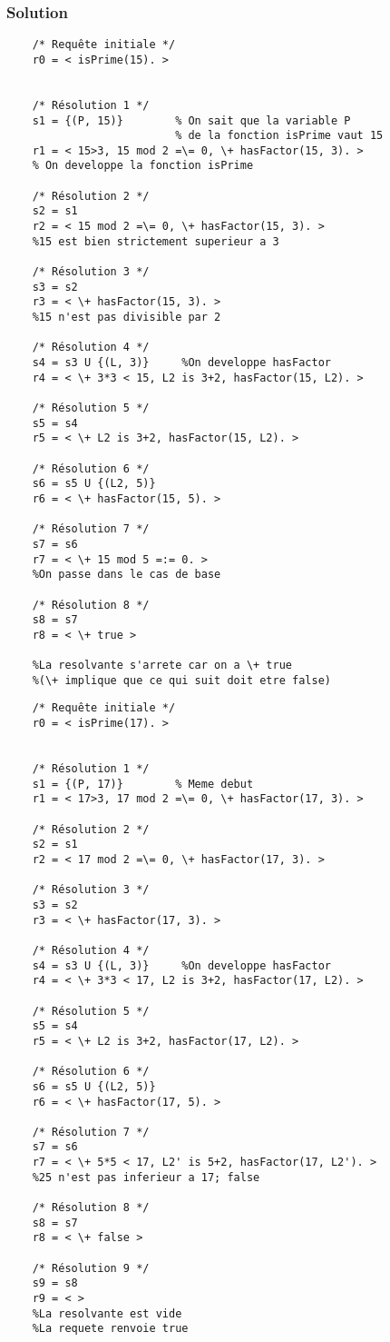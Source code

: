     \subsubsection*{Solution}

    \begin{lstlisting}
    /* Requête initiale */
    r0 = < isPrime(15). >


    /* Résolution 1 */
    s1 = {(P, 15)}        % On sait que la variable P
                          % de la fonction isPrime vaut 15
    r1 = < 15>3, 15 mod 2 =\= 0, \+ hasFactor(15, 3). >
    % On developpe la fonction isPrime

    /* Résolution 2 */
    s2 = s1
    r2 = < 15 mod 2 =\= 0, \+ hasFactor(15, 3). >
    %15 est bien strictement superieur a 3

    /* Résolution 3 */
    s3 = s2
    r3 = < \+ hasFactor(15, 3). >
    %15 n'est pas divisible par 2

    /* Résolution 4 */
    s4 = s3 U {(L, 3)}     %On developpe hasFactor
    r4 = < \+ 3*3 < 15, L2 is 3+2, hasFactor(15, L2). >

    /* Résolution 5 */
    s5 = s4
    r5 = < \+ L2 is 3+2, hasFactor(15, L2). >

    /* Résolution 6 */
    s6 = s5 U {(L2, 5)}
    r6 = < \+ hasFactor(15, 5). >

    /* Résolution 7 */
    s7 = s6
    r7 = < \+ 15 mod 5 =:= 0. >
    %On passe dans le cas de base

    /* Résolution 8 */
    s8 = s7
    r8 = < \+ true >

    %La resolvante s'arrete car on a \+ true
    %(\+ implique que ce qui suit doit etre false)
    \end{lstlisting}

    \begin{lstlisting}
    /* Requête initiale */
    r0 = < isPrime(17). >


    /* Résolution 1 */
    s1 = {(P, 17)}        % Meme debut
    r1 = < 17>3, 17 mod 2 =\= 0, \+ hasFactor(17, 3). >

    /* Résolution 2 */
    s2 = s1
    r2 = < 17 mod 2 =\= 0, \+ hasFactor(17, 3). >

    /* Résolution 3 */
    s3 = s2
    r3 = < \+ hasFactor(17, 3). >

    /* Résolution 4 */
    s4 = s3 U {(L, 3)}     %On developpe hasFactor
    r4 = < \+ 3*3 < 17, L2 is 3+2, hasFactor(17, L2). >

    /* Résolution 5 */
    s5 = s4
    r5 = < \+ L2 is 3+2, hasFactor(17, L2). >

    /* Résolution 6 */
    s6 = s5 U {(L2, 5)}
    r6 = < \+ hasFactor(17, 5). >

    /* Résolution 7 */
    s7 = s6
    r7 = < \+ 5*5 < 17, L2' is 5+2, hasFactor(17, L2'). >
    %25 n'est pas inferieur a 17; false

    /* Résolution 8 */
    s8 = s7
    r8 = < \+ false >

    /* Résolution 9 */
    s9 = s8
    r9 = < >
    %La resolvante est vide
    %La requete renvoie true
    \end{lstlisting}

